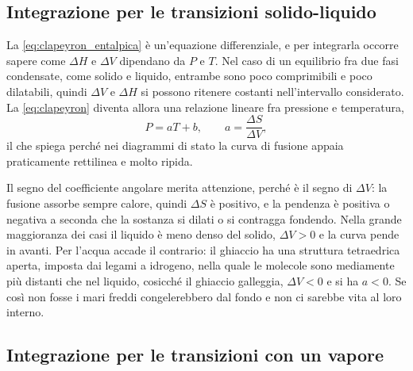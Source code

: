 \subsection{Integrazione per le transizioni solido-liquido}
 
La \eqref{eq:clapeyron_entalpica} è un'equazione differenziale, e per integrarla occorre sapere come $\Delta H$ e $\Delta V$ dipendano da $P$ e $T$.
Nel caso di un equilibrio fra due fasi condensate, come solido e liquido, entrambe sono poco comprimibili e poco dilatabili, quindi $\Delta V$ e $\Delta H$ si possono ritenere costanti nell'intervallo considerato.
La \eqref{eq:clapeyron} diventa allora una relazione lineare fra pressione e temperatura,
\begin{equation}
    P = aT + b ,
    \qquad a = \frac{\Delta S}{\Delta V} ,
    \label{eq:retta_fusione}
\end{equation}
il che spiega perché nei diagrammi di stato la curva di fusione appaia praticamente rettilinea e molto ripida.
 
Il segno del coefficiente angolare merita attenzione, perché è il segno di $\Delta V$: la fusione assorbe sempre calore, quindi $\Delta S$ è positivo, e la pendenza è positiva o negativa a seconda che la sostanza si dilati o si contragga fondendo.
Nella grande maggioranza dei casi il liquido è meno denso del solido, $\Delta V > 0$ e la curva pende in avanti.
Per l'acqua accade il contrario: il ghiaccio ha una struttura tetraedrica aperta, imposta dai legami a idrogeno, nella quale le molecole sono mediamente più distanti che nel liquido, cosicché il ghiaccio galleggia, $\Delta V < 0$ e si ha $a < 0$.
Se così non fosse i mari freddi congelerebbero dal fondo e non ci sarebbe vita al loro interno.
 
\subsection{Integrazione per le transizioni con un vapore}
 
